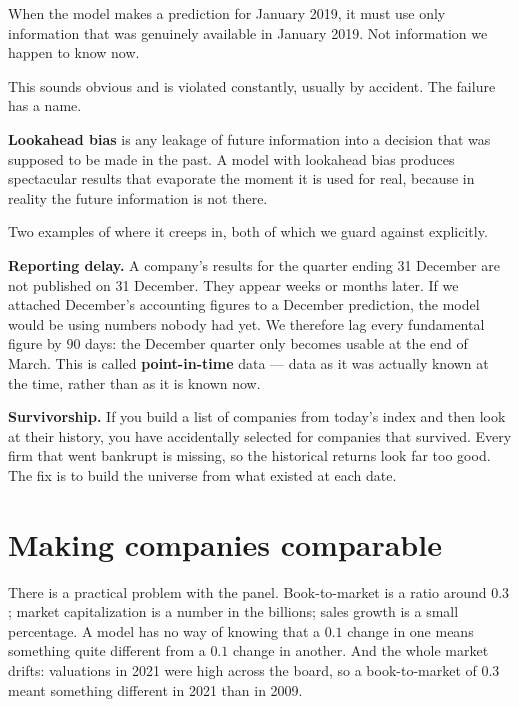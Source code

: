 \documentclass[11pt]{article}
\begin{document}
\begin{keybox}
When the model makes a prediction for January 2019, it must use only information that
was genuinely available in January 2019. Not information we happen to know now.
\end{keybox}

This sounds obvious and is violated constantly, usually by accident. The failure has a
name.

\begin{specbox}
\textbf{Lookahead bias} is any leakage of future information into a decision that was
supposed to be made in the past. A model with lookahead bias produces spectacular
results that evaporate the moment it is used for real, because in reality the future
information is not there.
\end{specbox}

Two examples of where it creeps in, both of which we guard against explicitly.

\textbf{Reporting delay.} A company's results for the quarter ending 31 December are
not published on 31 December. They appear weeks or months later. If we attached
December's accounting figures to a December prediction, the model would be using
numbers nobody had yet. We therefore lag every fundamental figure by $90$ days: the
December quarter only becomes usable at the end of March. This is called
\textbf{point-in-time} data --- data as it was actually known at the time, rather than
as it is known now.

\textbf{Survivorship.} If you build a list of companies from today's index and then
look at their history, you have accidentally selected for companies that survived.
Every firm that went bankrupt is missing, so the historical returns look far too good.
The fix is to build the universe from what existed at each date.

\section{Making companies comparable}

There is a practical problem with the panel. Book-to-market is a ratio around $0.3$;
market capitalization is a number in the billions; sales growth is a small percentage.
A model has no way of knowing that a $0.1$ change in one means something quite
different from a $0.1$ change in another. And the whole market drifts: valuations in
2021 were high across the board, so a book-to-market of $0.3$ meant something different
in 2021 than in 2009.
\end{document}
